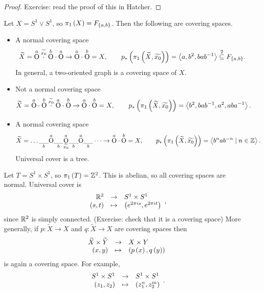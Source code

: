 \begin{proof}
Exercise: read the proof of this in Hatcher.
\end{proof}

\begin{example*}
Let $ X = S^1 \vee S^1 $, so $ \pi_1\left( X \right) = F_{\left\{ a, b \right\}} $. Then the following are covering spaces.
\begin{itemize}
\item A normal covering space
$$ \widetilde{X} = \overset{a}{\text{O}} \overset{\widetilde{x_0}}{\cdot} \overset{b}{\text{O}} \cdot \overset{a}{\text{O}} \to \overset{a}{\text{O}} \cdot \overset{b}{\text{O}} = X, \qquad p_*\left( \pi_1\left( \widetilde{X}, \widetilde{x_0} \right) \right) = \left\langle a, b^2, bab^{-1} \right\rangle \overset{2}{\subseteq} F_{\left\{ a, b \right\}}. $$
In general, a two-oriented graph is a covering space of $ X $.
\item Not a normal covering space
$$ \widetilde{X} = \overset{a}{\text{O}} \cdot \overset{b}{\text{O}} \overset{\widetilde{x_0}}{\cdot} \overset{a}{\text{O}} \cdot \overset{b}{\text{O}} \to \overset{a}{\text{O}} \cdot \overset{b}{\text{O}} = X, \qquad p_*\left( \pi_1\left( \widetilde{X}, \widetilde{x_0} \right) \right) = \left\langle b^2, bab^{-1}, a^2, aba^{-1} \right\rangle. $$
\item A normal covering space
$$ \widetilde{X} = \dots \underset{b}{\_\_} \overset{a}{\text{O}} \underset{b}{\_\_} \underset{\widetilde{x_0}}{\overset{a}{\text{O}}} \underset{b}{\_\_} \overset{a}{\text{O}} \underset{b}{\_\_} \dots \to \overset{a}{\text{O}} \cdot \overset{b}{\text{O}} = X, \qquad p_*\left( \pi_1\left( \widetilde{X}, \widetilde{x_0} \right) \right) = \left\langle b^nab^{-n} \mid n \in \mathbb{Z} \right\rangle. $$
Universal cover is a tree.
\end{itemize}
\end{example*}

\pagebreak

\begin{example*}
Let $ T = S^1 \times S^1 $, so $ \pi_1\left( T \right) = \mathbb{Z}^2 $. This is abelian, so all covering spaces are normal. Universal cover is
$$ \function{\R^2}{S^1 \times S^1}{\rb{s, t}}{\rb{e^{2\pi is}, e^{2\pi it}}}, $$
since $ \mathbb{R}^2 $ is simply connected. (Exercise: check that it is a covering space) More generally, if $ p : \widetilde{X} \to X $ and $ q : \widetilde{X} \to X $ are covering spaces then
$$ \function{\widetilde{X} \times \widetilde{Y}}{X \times Y}{\rb{x, y}}{\rb{p\rb{x}, q\rb{y}}} $$
is again a covering space. For example,
$$ \function{S^1 \times S^1}{S^1 \times S^1}{\rb{z_1, z_2}}{\rb{z_1^n, z_2^m}}. $$
\end{example*}

